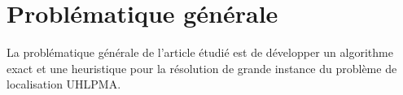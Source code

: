 \section{Problématique générale}

La problématique générale de l'article étudié est de développer un algorithme exact et une heuristique pour la résolution de grande instance du problème de localisation UHLPMA.




